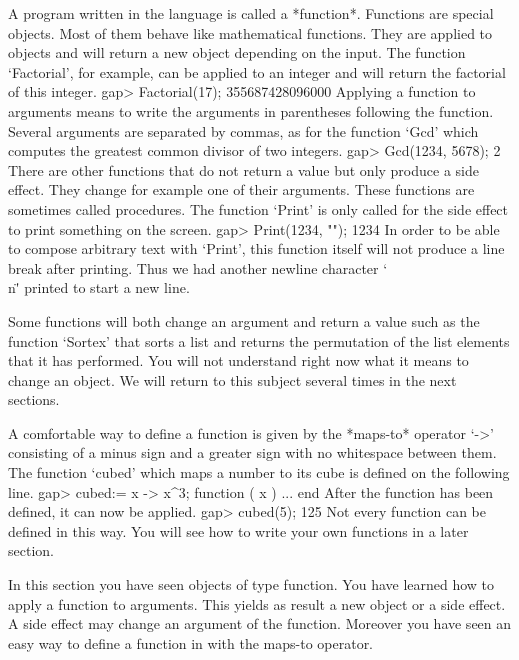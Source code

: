 A  program  written  in  the  {\GAP} language  is  called  a  *function*.
Functions  are   special  {\GAP}  objects.   Most  of  them  behave  like
mathematical functions.  They are applied to  objects and  will return  a
new  object  depending  on  the input.   The  function  `Factorial',  for
example,  can be applied to an  integer and will  return the factorial of
this integer.
\beginexample
    gap> Factorial(17);
    355687428096000 
\endexample
Applying  a  function  to arguments  means  to  write  the  arguments  in
parentheses following the function.   Several arguments are  separated by
commas, as for the  function  `Gcd' which  computes  the greatest  common
divisor of two integers.
\beginexample
    gap> Gcd(1234, 5678);
    2 
\endexample
There are other functions that do not return a value but  only  produce a
side effect.  They  change for  example  one of  their  arguments.  These
functions are sometimes called procedures.  The function `Print' is  only
called for the side effect to print something on the screen.
\beginexample
    gap> Print(1234, "\n");
    1234 
\endexample
In order to be able to compose arbitrary text with `Print', this function
itself will not produce a line break  after printing. Thus we had another
newline character `\"\\n\"' printed to start a new line.

Some functions will both change  an argument and  return a value such  as
the  function `Sortex' that sorts a  list and returns  the permutation of
the  list elements that  it has performed.  You will not understand right
now what it means  to change an object.  We will  return to this  subject
several times in the next sections.

A comfortable way to define a function is given by the *maps-to* operator
%
`->' consisting of  a minus sign and a   greater sign with  no whitespace
between them. The function  `cubed' which maps a  number  to its  cube is
defined on the following line.
\beginexample
    gap> cubed:= x -> x^3;
    function ( x ) ... end 
\endexample
After the function has been defined, it can now be applied.
\beginexample
    gap> cubed(5);
    125 
\endexample
Not every {\GAP} function can be defined in this  way.   You will see how
to write your own {\GAP} functions in a later section.

In this section you have seen {\GAP} objects of  type function.  You have
learned how to apply a function to  arguments.  This  yields as result  a
new object or a side effect.  A side effect may change an argument of the
function.   Moreover you have seen an easy  way  to define a  function in
{\GAP} with the maps-to operator.

